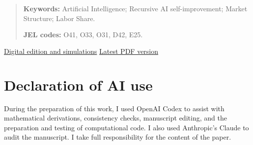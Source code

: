 \documentclass[11pt]{article}
\theoremstyle{remark}
\begin{document}
\begin{quote}
\small
\noindent\textbf{Keywords:} Artificial Intelligence; Recursive AI self-improvement;
Market Structure; Labor Share.

\noindent\textbf{JEL codes:} O41, O33, O31, D42, E25.
\end{quote}

\begin{center}
\small
\href{https://oliverpardo1979.github.io/ai-growth-and-labor/}{Digital edition and simulations}
\quad\textbar\quad
\href{https://oliverpardo1979.github.io/ai-growth-and-labor/paper/the-future-of-growth-and-human-labor-under-recursive-ai-self-improvement.pdf}{Latest PDF version}
\end{center}

\clearpage
\begingroup
\singlespacing
\small
\setcounter{tocdepth}{2}
\tableofcontents
\endgroup
\clearpage

\onehalfspacing












%


\appendix
{}
\renewcommand{\theequation}{\thesection\arabic{equation}}



\section*{Declaration of AI use}
During the preparation of this work, I used OpenAI Codex to assist with mathematical derivations, consistency checks, manuscript editing, and the preparation and testing of computational code. I also used Anthropic's Claude to audit the manuscript. I take full responsibility for the content of the paper.


{}

\end{document}
